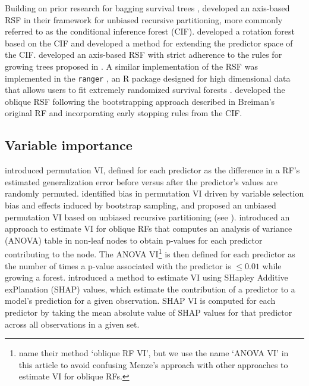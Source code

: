 \documentclass[twoside,11pt]{article}\usepackage[]{graphicx}\usepackage[]{xcolor}
\begin{document}
Building on prior research for bagging survival trees \citep{hothorn2004bagging}, \citet{hothorn2006unbiased} developed an axis-based RSF in their framework for unbiased recursive partitioning, more commonly referred to as the conditional inference forest (CIF). \citet{zhou2016random} developed a rotation forest based on the CIF and \citet{wang2017random} developed a method for extending the predictor space of the CIF. \citet{ishwaran2008random} developed an axis-based RSF with strict adherence to the rules for growing trees proposed in \citet{breiman2001random}. A similar implementation of the RSF was implemented in the \texttt{ranger} \citep{ranger}, an R package designed for high dimensional data that allows users to fit extremely randomized survival forests \citep{geurts2006extremely}. \citet{jaeger2019oblique} developed the oblique RSF following the bootstrapping approach described in Breiman's original RF and incorporating early stopping rules from the CIF.

\subsection{Variable importance} \label{sec:rw_vi}

\citet{breiman2001random} introduced permutation VI, defined for each predictor as the difference in a RF's estimated generalization error before versus after the predictor's values are randomly permuted. \citet{strobl2007bias} identified bias in permutation VI driven by variable selection bias and effects induced by bootstrap sampling, and proposed an unbiased permutation VI based on unbiased recursive partitioning (see \citet{hothorn2006unbiased}). \citet{menze2011oblique} introduced an approach to estimate VI for oblique RFs that computes an analysis of variance (ANOVA) table in non-leaf nodes to obtain p-values for each predictor contributing to the node. The ANOVA VI\footnote{\citet{menze2011oblique} name their method `oblique RF VI', but we use the name `ANOVA VI' in this article to avoid confusing Menze's approach with other approaches to estimate VI for oblique RFs.} is then defined for each predictor as the number of times a p-value associated with the predictor is $\leq 0.01$ while growing a forest. \citet{lundberg2017unified} introduced a method to estimate VI using SHapley Additive exPlanation (SHAP) values, which estimate the contribution of a predictor to a model's prediction for a given observation. SHAP VI is computed for each predictor by taking the mean absolute value of SHAP values for that predictor across all observations in a given set.
\end{document}
